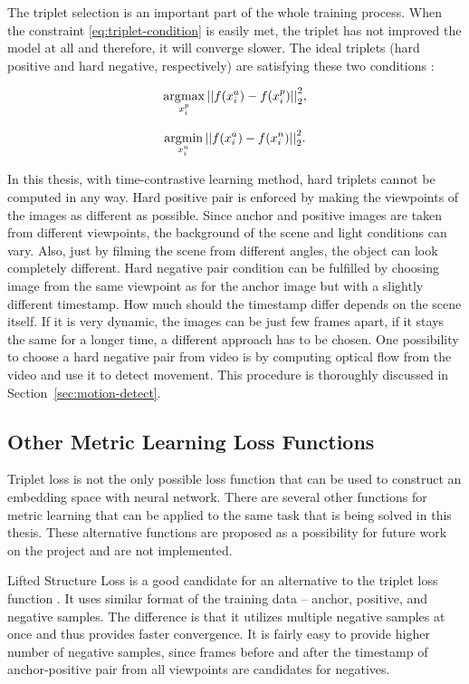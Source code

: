 The triplet selection is an important part of the whole training process. When the constraint \ref{eq:triplet-condition} is easily met, the triplet has not improved the model at all and therefore, it will converge slower. The ideal triplets (hard positive and hard negative, respectively) are satisfying these two conditions \cite{facenet-triplet-loss}:

\begin{equation}
    \label{eq:triplet-sel1}
    \operatorname*{arg\!\max}_{x^{p}_{i}}{{|| f(x^{a}_{i}) - f(x^{p}_{i}) ||}^{2}_{2}},
\end{equation}

\begin{equation}
    \label{eq:triplet-sel2}
    \operatorname*{arg\!\min}_{x^{n}_{i}}{{|| f(x^{a}_{i}) - f(x^{n}_{i}) ||}^{2}_{2}}.
\end{equation}

In this thesis, with time-contrastive learning method, hard triplets cannot be computed in any way. Hard positive pair is enforced by making the viewpoints of the images as different as possible. Since anchor and positive images are taken from different viewpoints, the background of the scene and light conditions can vary. Also, just by filming the scene from different angles, the object can look completely different. Hard negative pair condition can be fulfilled by choosing image from the same viewpoint as for the anchor image but with a slightly different timestamp. How much should the timestamp differ depends on the scene itself. If it is very dynamic, the images can be just few frames apart, if it stays the same for a longer time, a different approach has to be chosen. One possibility to choose a hard negative pair from video is by computing optical flow from the video and use it to detect movement. This procedure is thoroughly discussed in Section~\ref{sec:motion-detect}.

\subsection{Other Metric Learning Loss Functions}

Triplet loss is not the only possible loss function that can be used to construct an embedding space with neural network. There are several other functions for metric learning that can be applied to the same task that is being solved in this thesis. These alternative functions are proposed as a possibility for future work on the project and are not implemented.

Lifted Structure Loss is a good candidate for an alternative to the triplet loss function \cite{lifted-structure}. It uses similar format of the training data -- anchor, positive, and negative samples. The difference is that it utilizes multiple negative samples at once and thus provides faster convergence. It is fairly easy to provide higher number of negative samples, since frames before and after the timestamp of anchor-positive pair from all viewpoints are candidates for negatives.

